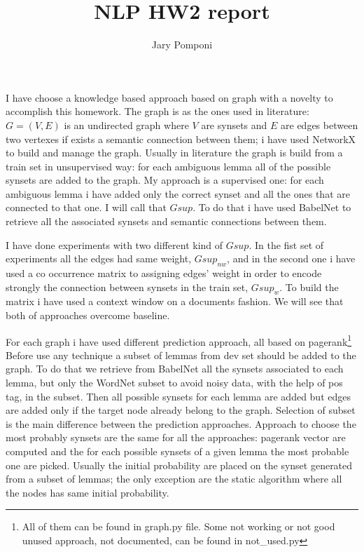 \documentclass[10pt]{article}
\title{\small NLP HW2 report}
\author{\small Jary Pomponi}
\date{\vspace{-5ex}}
\begin{document}
	\maketitle
	
I have choose a knowledge based approach based on graph with a novelty to accomplish this homework. The graph is as the ones used in literature: $G = (V, E)$ is an undirected graph where $V$ are synsets and $E$ are edges between two vertexes if exists a semantic connection between them; i have used NetworkX to build and manage the graph. Usually in literature the graph is build from a train set in unsupervised way: for each ambiguous lemma all of the possible synsets are added to the graph. My approach is a supervised one: for each ambiguous lemma i have added only the correct synset and all the ones that are connected to that one. I will call that $Gsup$. To do that i have used BabelNet to retrieve all the associated synsets and semantic connections between them.

I have done experiments with two different kind of $Gsup$. In the fist set of experiments all the edges had same weight, $Gsup_{nw}$, and in the second one i have used a co occurrence matrix to assigning edges' weight in order to encode strongly the connection between synsets in the train set, $Gsup_{w}$. To build the matrix i have used a context window on a documents fashion. We will see that both of approaches overcome baseline.

For each graph i have used different prediction approach, all based on pagerank\footnote{All of them can be found in graph.py file. Some not working or not good unused approach, not documented, can be found in not\_used.py} Before use any technique a subset of lemmas from dev set should be added to the graph. To do that we retrieve from BabelNet all the synsets associated to each lemma, but only the WordNet subset to avoid noisy data, with the help of pos tag, in the subset. Then all possible synsets for each lemma are added but edges are added only if the target node already belong to the graph. Selection of subset is the main difference between the prediction approaches. Approach to choose the most probably synsets are the same for all the approaches: pagerank vector are computed and the for each possible synsets of a given lemma the most probable one are picked. Usually the initial probability are placed on the synset generated from a subset of lemmas; the only exception are the static algorithm where all the nodes has same initial probability. 
\end{document}

